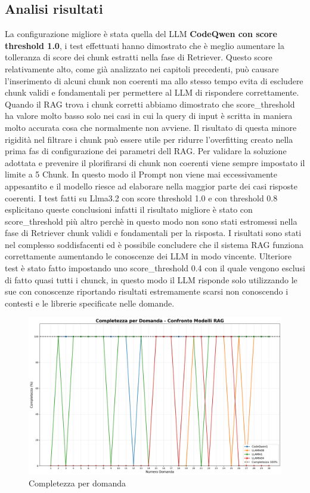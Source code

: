 \documentclass[12pt,a4paper,openright,twoside]{book}
\begin{document}
\subsection{Analisi risultati}
La configurazione migliore è stata quella del LLM \textbf{CodeQwen con score threshold 1.0},
i test effettuati hanno dimostrato che è meglio aumentare la tolleranza di score dei chunk estratti nella fase di Retriever.
Questo score relativamente alto, come già analizzato nei capitoli precedenti, può causare l'inserimento di alcuni chunk non coerenti ma allo stesso tempo evita di escludere chunk validi e fondamentali per permettere al LLM di rispondere correttamente.
Quando il RAG trova i chunk corretti abbiamo dimostrato che score\_threshold ha valore molto basso solo nei casi in cui la query di input è scritta in maniera molto accurata cosa che 
normalmente non avviene.
Il risultato di questa minore rigidità nel filtrare i chunk può essere utile per ridurre l'overfitting creato nella prima fas di configurazione dei parametri dell RAG.
Per validare la soluzione adottata e prevenire il plorifirarsi di chunk non coerenti viene sempre impostato il limite a 5 Chunk.
In questo modo il Prompt non viene mai eccessivamente appesantito e il modello riesce ad elaborare nella maggior parte dei casi risposte coerenti.
I test fatti su Llma3.2 con score threshold 1.0 e con threshold 0.8 esplicitano queste conclusioni infatti il risultato migliore è stato con score\_threshold più altro perchè in questo modo 
non sono stati estromessi nella fase di Retriever chunk validi e fondamentali per la risposta.
I risultati sono stati nel complesso soddisfacenti ed è possibile concludere che il sistema RAG funziona correttamente aumentando le conoscenze dei LLM in modo vincente.
Ulteriore test è stato fatto impostando uno score\_threshold 0.4 con il quale vengono esclusi di fatto quasi tutti i chunck, in questo modo il LLM risponde solo utilizzando le sue con conoscenze riportando risultati estremamente scarsi non conoscendo i contesti e le librerie specificate nelle domande.
\begin{figure}[h]
    \centering
    \includegraphics[width=\textwidth]{figures/completezza_per_domanda.png}
    \caption{Completezza per domanda}
    \label{fig:completezza-per-domanda}
\end{figure}
\end{document}
